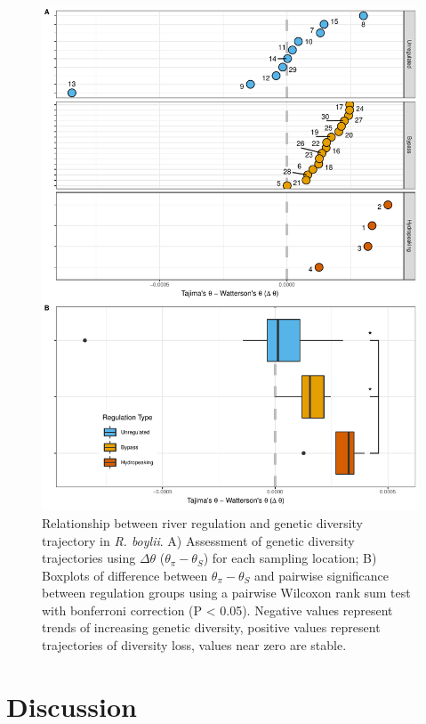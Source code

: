 \documentclass[twoside,12pt,final]{ucthesis-CA2012} %
\begin{document}
\begin{ucmainmatter}
\begin{figure}
\includegraphics[height=0.8\textheight,scale=1.1]{figure/ch1/fig_04ab_theta_combined_for_phd} \caption{Relationship between river regulation and genetic
diversity trajectory in \emph{R. boylii}. A) Assessment of genetic
diversity trajectories using \(\Delta\theta\)
(\(\theta_\pi - \theta_S\)) for each sampling location; B) Boxplots of
difference between \(\theta_\pi - \theta_S\) and pairwise significance
between regulation groups using a pairwise Wilcoxon rank sum test with
bonferroni correction (P \textless{} 0.05). Negative values represent
trends of increasing genetic diversity, positive values represent
trajectories of diversity loss, values near zero are stable.}\label{fig:CH1F4theta}
\end{figure}
\clearpage

\hypertarget{discussion}{%
\section{Discussion}\label{discussion}}


\end{ucmainmatter}
\end{document}
